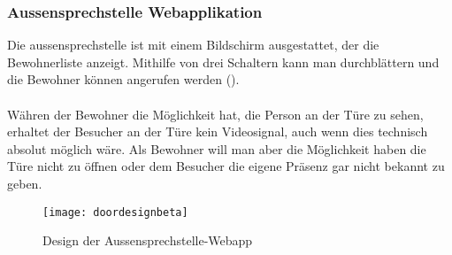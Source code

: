 \subsubsection{Aussensprechstelle Webapplikation}
Die \gls{aussensprechstelle} ist mit einem Bildschirm ausgestattet, der die Bewohnerliste anzeigt. Mithilfe von drei Schaltern kann man durchblättern und die Bewohner können angerufen werden ().
\\
\\
Währen der Bewohner die Möglichkeit hat, die Person an der Türe zu sehen, erhaltet der Besucher an der Türe kein Videosignal, auch wenn dies technisch absolut möglich wäre. Als Bewohner will man aber die Möglichkeit haben die Türe nicht zu öffnen oder dem Besucher die eigene Präsenz gar nicht bekannt zu geben.

\begin{figure}[htb!]
	\begin{center}
		\texttt{[image: doordesignbeta]}
		\caption[Design der Client-Webapp]{Design der Aussensprechstelle-Webapp}
		\label{fig:doordesign}
	\end{center}
\end{figure}


